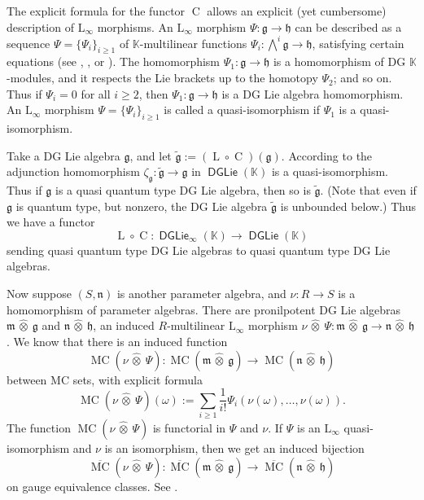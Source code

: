 \documentclass[a4paper, 10pt]{amsart}
\theoremstyle{definition}
\numberwithin{equation}{section}
\newcommand{\opn}{\operatorname}
\newcommand{\cat}[1]{\operatorname{\mathsf{#1}}}
\newcommand{\ol}{\overline}
\newcommand{\mfrak}[1]{\mathfrak{#1}}
\newcommand{\mrm}[1]{\mathrm{#1}}
\newcommand{\mbb}[1]{\mathbb{#1}}
\newcommand{\smfrac}[2]{\textstyle \frac{#1}{#2}}
\newcommand{\hatotimes}[1]{\, \what{{\otimes}}_{#1} \,}
\newcommand{\hot}{\hatotimes{}}
\newcommand{\til}[1]{\tilde{#1}}
\newcommand{\what}[1]{\widehat{#1}}
\newcommand{\K}{\mbb{K}}
\newcommand{\g}{\mfrak{g}}
\newcommand{\m}{\mfrak{m}}
\newcommand{\h}{\mfrak{h}}
\newcommand{\n}{\mfrak{n}}
\newcommand{\om}{\omega}
\newcommand{\bwedge}{{\textstyle \bigwedge}}
\begin{document}
The explicit formula for the functor $\opn{C}$ allows an explicit (yet
cumbersome) description of $\mrm{L}_{\infty}$ morphisms. An $\mrm{L}_{\infty}$
morphism $\Psi : \g \to \h$ can be described as a sequence
$\Psi = \{ \Psi_i \}_{i \geq 1}$ of $\K$-multilinear functions
$\Psi_i : \bwedge^i \g \to \mfrak{h}$,
satisfying certain equations (see \cite{Ko1}, 
\cite[Definition 3.7]{Ye1}, \cite[Section 3.7]{CKTB} or \cite[Section 7]{Ye7}).
The homomorphism $\Psi_1 : \g \to \mfrak{h}$ is a homomorphism of DG
$\K$-modules, and it respects the Lie brackets up to the homotopy
$\Psi_2$; and so on. Thus if $\Psi_i = 0$ for all $i \geq 2$, then 
$\Psi_1 : \g \to \mfrak{h}$ is a DG Lie algebra homomorphism.
An $\mrm{L}_{\infty}$ morphism 
$\Psi = \{ \Psi_i \}_{i \geq 1}$ is called a quasi-isomorphism
if $\Psi_1$ is a quasi-isomorphism. 

Take a DG Lie algebra $\g$, and let 
$\til{\g} := (\opn{L} \circ \opn{C})(\g)$.
According to \cite[Proposition 4.4.3(1)]{Hi2} the adjunction homomorphism
$\zeta_{\g} : \til{\g} \to \g$ in $\cat{DGLie}(\K)$ is a 
quasi-isomorphism. Thus if $\g$ is a quasi quantum type DG Lie algebra, then 
so is $\til{\g}$. (Note that even if $\g$ is quantum type, but nonzero, the DG
Lie algebra  $\til{\g}$ is unbounded below.) Thus we have a functor 
\[ \opn{L} \circ \opn{C} : \cat{DGLie}_{\infty}(\K) \to \cat{DGLie}(\K) \]
sending quasi quantum type DG Lie algebras to quasi quantum type DG Lie
algebras. 

Now suppose $(S, \n)$ is another parameter algebra, and
$\nu : R \to S$ is a homomorphism of parameter algebras. 
There are pronilpotent DG Lie algebras $\m \hot \g$ and 
$\n \hot \h$, an
induced $R$-multilinear $\mrm{L}_{\infty}$ morphism
$\nu \hot \Psi : \m \hot \g \to \n \hot \mfrak{h}$.
We know that there is an induced function
\begin{equation}
\opn{MC}(\nu \hot \Psi) : \opn{MC}(\m \hot \g) \to 
\opn{MC}(\n \hot \mfrak{h})
\end{equation}
between MC sets, with explicit formula
\begin{equation} \label{eqn:300}
\opn{MC}(\nu \hot \Psi) (\om) :=
\sum_{i \geq 1} \smfrac{1}{i!} \Psi_{i}(\nu(\om), \ldots, \nu(\om)) .
\end{equation}
The function $\opn{MC}(\nu \hot \Psi)$ is functorial in $\Psi$ and $\nu$.
If $\Psi$ is an $\mrm{L}_{\infty}$ quasi-isomorphism and $\nu$ is an
isomorphism, then we get an induced bijection
\begin{equation} \label{eqn:22}
\ol{\opn{MC}}(\nu \hot \Psi) : \ol{\opn{MC}}(\m \hot \g) \to 
\ol{\opn{MC}}(\n \hot \mfrak{h})  
\end{equation}
on gauge equivalence classes.
See \cite[Theorem 4.2]{Ye7}.
\end{document}
